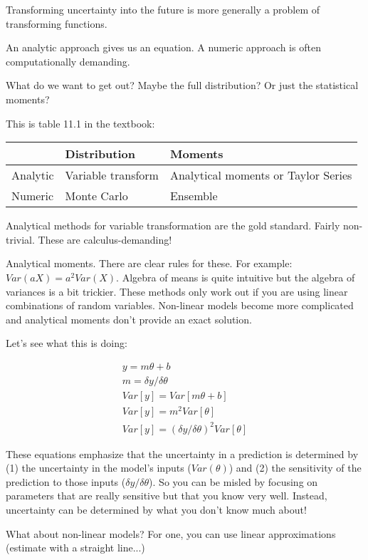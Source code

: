 \documentclass[12pt, oneside]{article}   	%
\begin{document}
Transforming uncertainty into the future is more generally a problem of transforming functions.

An analytic approach gives us an equation. A numeric approach is often computationally demanding.

What do we want to get out? Maybe the full distribution? Or just the statistical moments?

This is table 11.1 in the textbook: 

\begin{table}[h!]
\begin{tabular}{l|l|l|}
 & Distribution & Moments  \\ \hline
Analytic & Variable transform  & Analytical moments or Taylor Series    \\ \hline
Numeric & Monte Carlo & Ensemble  \\ \hline
\end{tabular}
\end{table}

Analytical methods for variable transformation are the gold standard. Fairly non-trivial. These are calculus-demanding!

Analytical moments. There are clear rules for these. For example: $Var(aX) = a^2 Var(X)$. Algebra of means is quite intuitive but the algebra of variances is a bit trickier. These methods only work out if you are using linear combinations of random variables. Non-linear models become more complicated and analytical moments don't provide an exact solution.

Let's see what this is doing:

\begin{align} y = m \theta + b \\
m = \delta y / \delta \theta \\
Var[y] = Var[m \theta + b ] \\
Var[y] = m^2 Var[\theta] \\
Var[y] = (\delta y / \delta \theta)^2 Var[ \theta ]
\end{align}

These equations emphasize that the uncertainty in a prediction is determined by (1) the uncertainty in the model's inputs ($Var(\theta)$) and (2) the sensitivity of the prediction to those inputs ($\delta y / \delta \theta$). So you can be misled by focusing on parameters that are really sensitive but that you know very well. Instead, uncertainty can be determined by what you don't know much about!

What about non-linear models? For one, you can use linear approximations (estimate with a straight line...)
\end{document}
